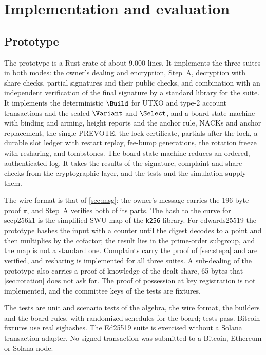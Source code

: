 \section{Implementation and evaluation}\label{sec:eval}

\subsection{Prototype}

The prototype is a Rust crate of about 9{,}000 lines. It implements the three suites in both modes: the owner's dealing and encryption, Step~A, decryption with share checks, partial signatures and their public checks, and combination with an independent verification of the final signature by a standard library for the suite. It implements the deterministic $\Build$ for UTXO and type-2 account transactions and the sealed $\Variant$ and $\Select$, and a board state machine with binding and arming, height reports and the anchor rule, NACKs and anchor replacement, the single PREVOTE, the lock certificate, partials after the lock, a durable slot ledger with restart replay, fee-bump generations, the rotation freeze with resharing, and tombstones. The board state machine reduces an ordered, authenticated log. It takes the results of the signature, complaint and share checks from the cryptographic layer, and the tests and the simulation supply them.

The wire format is that of \cref{sec:msg}: the owner's message carries the 196-byte proof $\pi$, and Step~A verifies both of its parts. The hash to the curve for secp256k1 is the simplified SWU map of the \texttt{k256} library. For edwards25519 the prototype hashes the input with a counter until the digest decodes to a point and then multiplies by the cofactor; the result lies in the prime-order subgroup, and the map is not a standard one. Complaints carry the proof of \cref{sec:stepa} and are verified, and resharing is implemented for all three suites. A sub-dealing of the prototype also carries a proof of knowledge of the dealt share, 65 bytes that \cref{sec:rotation} does not ask for. The proof of possession at key registration is not implemented, and the committee keys of the tests are fixtures.

The tests are unit and scenario tests of the algebra, the wire format, the builders and the board rules, with randomized schedules for the board; \implTestsPassed{} tests pass. Bitcoin fixtures use real sighashes. The Ed25519 suite is exercised without a Solana transaction adapter. No signed transaction was submitted to a Bitcoin, Ethereum or Solana node.

